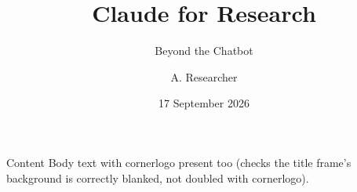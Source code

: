 \documentclass{beamer}
\title{Claude for Research}
\subtitle{Beyond the Chatbot}
\author{A. Researcher}
\institute{Dept \\ a@nd.edu}
\date{17 September 2026}
\begin{document}
{
\begin{frame}[plain]\titlepage\end{frame}
}
\begin{frame}{Content}
Body text with cornerlogo present too (checks the title frame's
background is correctly blanked, not doubled with cornerlogo).
\end{frame}
\end{document}
